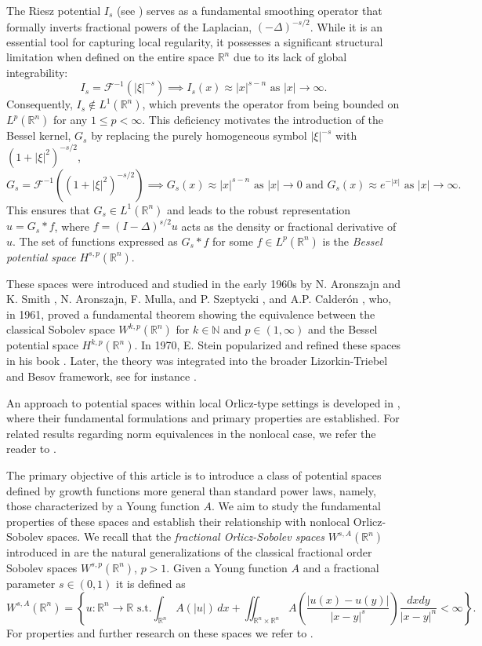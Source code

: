 \documentclass[leqno,twoside, 12pt]{amsart}
\theoremstyle{plain}
\numberwithin{equation}{section} \numberwithin{figure}{section}
\theoremstyle{definition}
\newcommand{\R}{\mathbb R}
\numberwithin{equation}{section}
\begin{document}
The Riesz potential $I_s$ (see \cite{Riesz}) serves as a fundamental smoothing operator that formally inverts fractional powers of the Laplacian, $(-\Delta)^{-s/2}$. While it is an essential tool for capturing local regularity, it possesses a significant structural limitation when defined on the entire space $\mathbb{R}^n$ due to its lack of global integrability: 
$$
I_s = \mathcal{F}^{-1}(|\xi|^{-s}) \implies I_s(x) \approx |x|^{s-n} \text{ as } |x| \to \infty.
$$
Consequently, $I_s \notin L^1(\mathbb{R}^n)$, which prevents the operator from being bounded on $L^p(\mathbb{R}^n)$ for any $1 \le p < \infty$. \noindent This deficiency motivates the introduction of the Bessel kernel, $G_s$ by replacing the purely homogeneous symbol $|\xi|^{-s}$ with  $(1 + |\xi|^2)^{-s/2}$, 
$$
G_s = \mathcal{F}^{-1}\left((1 + |\xi|^2)^{-s/2}\right) \implies G_s(x) \approx |x|^{s-n} \text{ as } |x|\to 0 \text{ and } G_s(x) \approx e^{-|x|} \text{ as } |x|\to\infty.
$$ 
This  ensures that $G_s \in L^1(\mathbb{R}^n)$ and leads to the robust representation $u = G_s * f$, where $f = (I - \Delta)^{s/2} u$ acts as the density or fractional derivative of $u$. The set of functions  expressed as $G_s * f$ for some $f \in L^p(\mathbb{R}^n)$ is  the \emph{Bessel potential space} $H^{s, p}(\mathbb{R}^n)$. 

These spaces were introduced and studied in the early 1960s by N. Aronszajn and K. Smith \cite{ASmith}, N. Aronszajn, F. Mulla, and P. Szeptycki  \cite{AS}, and A.P. Calderón \cite{Calderon}, who, in 1961,  proved a fundamental theorem showing the equivalence between the classical Sobolev space $W^{k,p}(\mathbb{R}^n)$ for $k \in \mathbb{N}$ and $p\in (1, \infty)$ and  the Bessel potential space $H^{k,p}(\mathbb{R}^n)$. In 1970, E. Stein popularized and refined these spaces in his book \cite{St}. Later,  the  theory was integrated into the broader Lizorkin-Triebel and Besov framework, see for instance \cite{Triebel}. 

An approach to potential spaces within local Orlicz-type settings is developed in \cite{A96, A97, A10, EGO, GHN, S}, where their fundamental formulations and primary properties are established. For related results regarding norm equivalences in the nonlocal case, we refer the reader to \cite{BC}.

 
The primary objective of this article is to introduce a class of potential spaces defined by growth functions more general than standard power laws, namely, those characterized by a Young function $A$.  We aim to study the fundamental properties of these spaces and establish their relationship with nonlocal Orlicz-Sobolev spaces. We recall that the \emph{fractional Orlicz-Sobolev spaces} $W^{s,A}(\R^n)$ introduced in \cite{ACPS, FBS} are the natural generalizations of the classical fractional order Sobolev spaces $W^{s,p}(\R^n)$, $p>1$.  Given a Young function $A$ and a fractional parameter $s\in (0,1)$ it is defined as
$$
W^{s,A}(\R^n)=\left\{u\colon \R^n\to \R \text{ s.t.} \int_{\R^n} A(|u|)\,dx + \iint_{\R^n\times \R^n} A\left(\frac{|u(x)-u(y)|}{|x-y|^{s}} \right)\frac{dxdy}{|x-y|^n} <\infty \right\}.
$$
For properties and further research on these spaces we refer to \cite{ACPS, ACPS1,ABS, BOT, FBS}.
\end{document}
